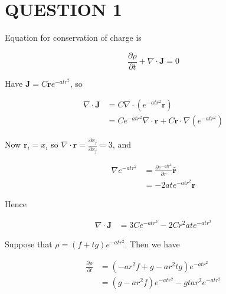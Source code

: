\documentclass[a4paper]{article}
\begin{document}
	
\maketitle

\section{QUESTION 1}

Equation for conservation of charge is

\[ \frac{\partial \rho }{\partial t}  + \nabla \cdot \mathbf{J} = 0 \]

Have $  \mathbf{J} = C \mathbf{r} e^{-atr^{2}} $, so 

\begin{align*}
\nabla \cdot \mathbf{J} & = C \nabla \cdot (e^{-atr^{2}} \mathbf{r} )   \\
& = C e^{-atr^{2}} \nabla \cdot \mathbf{r} + C \mathbf{r} \cdot \nabla (e^{-atr^{2}})
\end{align*}

Now $ \mathbf{r}_{i} = x_{i} $ so $ \nabla \cdot \mathbf{r} = \frac{\partial x_{j}}{\partial x_{j}} = 3 $, and 


\begin{align*}                                         
 \nabla e^{-atr^{2}} & = \frac{\partial e^{-atr^{2}} }{\partial r} \hat{\mathbf{r}} \\
& = - 2ate^{-atr^{2}} \mathbf{r}
\end{align*}
                                                       

Hence

\begin{align*}
\nabla \cdot \mathbf{J} & = 3 C e^{-atr^{2}} - 2C  r^{2} ate^{-atr^{2}}
\end{align*}

Suppose that $ \rho = (f + tg)e^{-atr^{2}} $. Then we have

\begin{align*}
\frac{\partial \rho }{\partial t} & = (-ar^{2} f + g - ar^{2}tg)e^{-atr^{2}} \\
& = (g - ar^{2} f) e^{-atr^{2}} - gt ar^{2} e^{-atr^{2}} \\
\end{align*}
\end{document}
